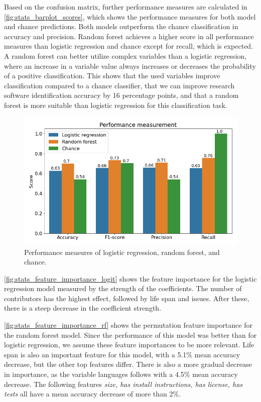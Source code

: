Based on the confusion matrix, further performance measures are calculated in \autoref{fig:stats_barplot_scores}, which shows the performance measures for both model and chance predictions. Both models outperform the chance classification in accuracy and precision. Random forest achieves a higher score in all performance measures than logistic regression and chance except for recall, which is expected. A random forest can better utilize complex variables than a logistic regression, where an increase in a variable value always increases or decreases the probability of a positive classification. This shows that the used variables improve classification compared to a chance classifier, that we can improve research software identification accuracy by 16 percentage points, and that a random forest is more suitable than logistic regression for this classification task.

\begin{figure}[h!]
\centerline{
\includegraphics[scale=0.5]{figures_results/stats_barplot_scores.png}}
\caption{Performance measures of logistic regression, random forest, and chance.
\label{fig:stats_barplot_scores}}
\end{figure}

\newpage
\autoref{fig:stats_feature_importance_logit} shows the feature importance for the logistic regression model measured by the strength of the coefficients. The number of contributors has the highest effect, followed by life span and issues. After these, there is a steep decrease in the coefficient strength. 

\autoref{fig:stats_feature_importance_rf} shows the permutation feature importance for the random forest model. Since the performance of this model was better than for logistic regression, we assume these feature importances to be more relevant. Life span is also an important feature for this model, with a 5.1\% mean accuracy decrease, but the other top features differ. There is also a more gradual decrease in importance, as the variable languages follows with a 4.5\% mean accuracy decrease. The following features \textit{size, has install instructions, has license, has tests} all have a mean accuracy decrease of more than 2\%. 




